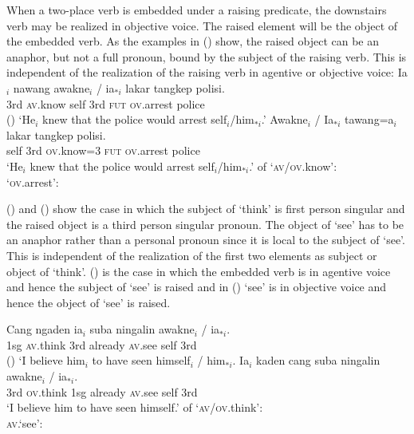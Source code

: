 \documentclass[output=paper,biblatex,babelshorthands,newtxmath,draftmode,colorlinks,citecolor=brown]{langscibook}
\begin{document}
When a two-place verb is embedded under a raising predicate, the downstairs verb may be realized in
objective voice. The raised element will be the object of the embedded verb. As the examples in
() show, the raised object can be an anaphor, but not a full pronoun, bound by the subject of
the raising verb. This is independent of the realization of the raising verb in agentive or objective voice: 
\eal
\ex 
\gll Ia$_i$ nawang           awakne$_i$ / ia$_{*i}$ lakar        tangkep            polisi.\\
    3rd    \textsc{av}.know self      {} 3rd      \textsc{fut} \textsc{ov}.arrest police\\\hfill()
\glt `He$_i$ knew that the police would arrest self$_{i}$/him$_{*i}$.'
\ex 
\gll Awakne$_i$ / Ia$_{*i}$        tawang=a$_i$           lakar       tangkep            polisi.\\
    self       {} \hphantom{*}3rd \textsc{ov}.know=3 \textsc{fut} \textsc{ov}.arrest police\\
\glt `He$_i$ knew that the police would arrest self$_{i}$/him$_{*i}$.'
\ex \argst of `\textsc{av}/\textsc{ov}.know':\\
\ex `\textsc{ov}.arrest':\\
\zl


() and () show the case in which the \argst subject of `think' is first person singular and the
raised \argst object is a third person singular pronoun. The object of `see' has to be an anaphor rather than a personal pronoun
since it is local to the subject of `see'. This is independent of the realization of the first two
\argst elements as subject or object of `think'. () is the case in which the embedded verb is
in agentive voice and hence the subject of `see' is raised and in () `see' is in objective voice and
hence the object of `see' is raised.

\eal
\ex
\gll Cang ngaden            ia$_i$ suba    ningalin        awakne$_i$ /  ia$_{*i}$.\\
     1sg  \textsc{av}.think 3rd    already \textsc{av}.see self       {} 3rd\\\hfill()
\glt `I believe him$_i$ to have seen himself$_i$ / him$_{*i}$.
\ex
\gll Ia$_i$ kaden             cang suba    ningalin        awakne$_i$ / ia$_{*i}$.\\ 
     3rd \textsc{ov}.think 1sg  already \textsc{av}.see self       {} 3rd\\
\glt `I believe him to have seen himself.'
\ex \argst of `\textsc{av}/\textsc{ov}.think':\\
\ex \textsc{av}.`see':\\
\zl
\end{document}
